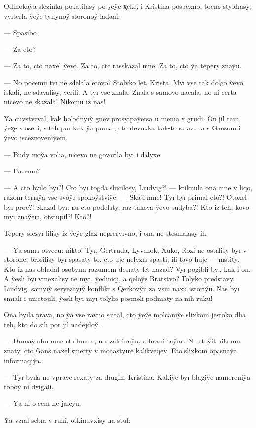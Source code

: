\documentclass[10pt]{book}
\begin{document}
Odinokay̆a slezinka pokatilasy po y̆ey̆e x̨eke, i Kristina pospexno, tocno styıdıasy, vyıterla y̆ey̆e tyılynoy̆ storonoy̆ ladoni.

— Spasibo.

— Za cto?

— Za to, cto naxel y̆evo. Za to, cto rasskazal mne. Za to, cto y̆a tepery znay̆u.

— No pocemu tyı ne sdelala etovo? Stolyko let, Krista. Myı vse tak dolgo y̆evo iskali, ne sdavalisy, verili. A tyı vse znala. Znala s samovo nacala, no ni certa nicevo ne skazala! Nikomu iz nas!

Y̆a cuvstvoval, kak holodnyıy̆ gnev prosyıpay̆etsa u menıa v grudi. On jil tam y̆ex̨e s oseni, s teh por kak y̆a ponıal, cto devuxka kak-to svıazana s Gansom i y̆evo isceznoveniy̆em.

— Budy moy̆a volıa, nicevo ne govorila byı i dalyxe.

— Pocemu?

— A cto byılo byı?! Cto byı togda slucilosy, Lıudvig?! — kriknula ona mne v liqo, razom terıay̆a vse svoy̆e spokoy̆stviy̆e. — Skaji mne! Tyı byı prinıal eto?! Otoxel byı proc?! Skazal byı: nu cto podelaty, raz takova y̆evo sudyba?! Kto iz teh, kovo myı znay̆em, otstupil?! Kto?!

Tepery slezyı lilisy iz y̆ey̆e glaz nepreryıvno, i ona ne stesnıalasy ih.

— Y̆a sama otvecu: nikto! Tyı, Gertruda, Lyvenok, Xuko, Rozi ne ostalisy byı v storone, brosilisy byı spasaty to, cto uje nelyzıa spasti, ili tovo huje — mstity. Kto iz nas obladal osobyım razumom desıaty let nazad? Vyı pogibli byı, kak i on. A y̆esli byı vmexalisy ne myı, y̆ediniqi, a qeloy̆e Bratstvo? Tolyko predstavy, Lıudvig, samyıy̆ seryeznyıy̆ konflikt s Qerkovy̆u za vsıu naxu istoriy̆u. Nas byı smıali i unictojili, y̆esli byı myı tolyko posmeli podnıaty na nih ruku!

Ona byıla prava, no y̆a vse ravno scital, cto y̆ey̆e molcaniy̆e slixkom jestoko dlıa teh, kto do sih por jil nadejdoy̆.

— Dumay̆ obo mne cto hocex, no, zaklinay̆u, sohrani tay̆nu. Ne stoy̆it nikomu znaty, cto Gans naxel smerty v monastyıre kalikveqev. Eto slixkom opasnay̆a informaqiy̆a.

— Tyı byıla ne vprave rexaty za drugih, Kristina. Kakiy̆e byı blagiy̆e namereniy̆a toboy̆ ni dvigali.

— Y̆a ni o cem ne jaley̆u.

Y̆a vzıal sebıa v ruki, otkinuvxisy na stul:
\end{document}
